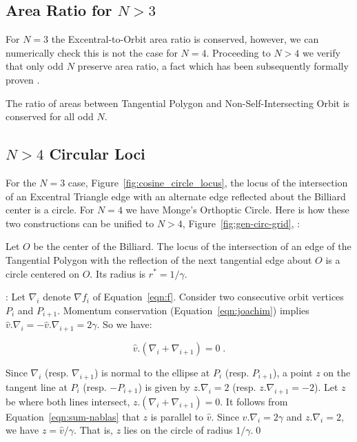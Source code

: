 \subsection{Area Ratio for $N>3$}

For $N=3$ the Excentral-to-Orbit area ratio is conserved, however, we can numerically check this is not the case for $N=4$. Proceeding to $N>4$ we verify that only odd $N$ preserve area ratio, a fact which has been subsequently formally proven \cite{sergei19_private_meromorphic}.

\begin{theorem}
The ratio of areas between Tangential Polygon and Non-Self-Intersecting Orbit is conserved for all odd $N$.
\end{theorem}

\subsection{$N>4$ Circular Loci}

For the $N=3$ case,  Figure~\ref{fig:cosine_circle_locus}, the locus of the intersection of an Excentral Triangle edge with an alternate edge reflected about the Billiard center is a circle. For $N=4$ we have Monge's Orthoptic Circle. Here is how these two constructions can be unified to $N>4$, Figure~\ref{fig:gen-circ-grid}, \cite[pl\#5]{dsr_math_intell_playlist}:

\begin{theorem}
Let $O$ be the center of the Billiard. The locus of the intersection of an edge of the Tangential Polygon with the reflection of the next tangential edge about $O$ is a circle centered on $O$. Its radius is $r^*=1/\gamma$.
\end{theorem}

 \cite{sergei19_private_circles}: Let $\nabla_i$ denote $\nabla{f_i}$ of Equation~\ref{eqn:f}. Consider two consecutive orbit vertices $P_{i}$ and $P_{i+1}$. Momentum conservation (Equation~\ref{eqn:joachim}) implies $\hat{v}.\nabla_i= -\hat{v}.\nabla_{i+1}=2\gamma$. So we have:

\begin{equation}
    \hat{v}.\left(\nabla_i+ \nabla_{i+1}\right)=0\;.
    \label{eqn:sum-nablas}
\end{equation}

\noindent Since $\nabla_i$ (resp. $\nabla_{i+1}$) is normal to the ellipse at $P_{i}$ (resp. $P_{i+1}$), a point $z$ on the tangent line at $P_i$ (resp. $-P_{i+1}$) is given by $z.\nabla_i=2$ (resp. $z.\nabla_{i+1}=-2$). Let $z$ be where both lines intersect, $z.\left(\nabla_i+\nabla_{i+1}\right)=0$. It follows from Equation~\ref{eqn:sum-nablas} that $z$ is parallel to $\hat{v}$. Since $\hat{v}.\nabla_i=2\gamma$ and $z.\nabla_i=2$, we have $z = \hat{v}/\gamma$. That is, $z$ lies on the circle of radius $1/\gamma$.\qed

